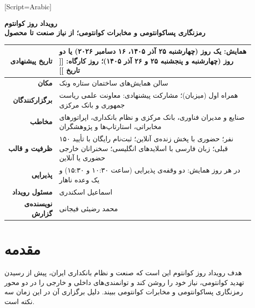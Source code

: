 \documentclass[a4paper,12pt]{article}
\newcommand{\placeholder}[1]{%
	\textcolor{mci-gold}{\textbf{[[ #1 ]]}}%
}
\begin{document}
	\fixedfont
	[Script=Arabic]

	\begin{center}
		{\color{mci-blue}\fontsize{24}{32}\selectfont\bfseries رویداد روز کوانتوم}\\[4pt]
		{\color{mci-gold}\large\bfseries رمزنگاری پساکوانتومی و مخابرات کوانتومی؛ از نیاز صنعت تا محصول}\\[2pt]
		{\color{mci-gray}\small {}}
	\end{center}

	\vspace{4pt}

	\begin{tabularx}{\textwidth}{>{\bfseries\color{mci-blue}}r X}
		\toprule
		تاریخ پیشنهادی & همایش: یک روز (چهارشنبه ۲۵ آذر ۱۴۰۵، ۱۶ دسامبر ۲۰۲۶) یا دو روز (چهارشنبه و پنجشنبه ۲۵ و ۲۶ آذر ۱۴۰۵)؛ روز کارگاه: \placeholder{تاریخ} \\
		\midrule
		مکان & سالن همایش‌های ساختمان ستاره ونک \\
		\midrule
		برگزارکنندگان & همراه اول (میزبان)؛ مشارکت پیشنهادی: معاونت علمی ریاست جمهوری و بانک مرکزی \\
		\midrule
		مخاطب & صنایع و مدیران فناوری، بانک مرکزی و نظام بانکداری، اپراتورهای مخابراتی، استارتاپ‌ها و پژوهشگران \\
		\midrule
		ظرفیت و قالب & ۱۵۰ نفر؛ حضوری با پخش زنده‌ی آنلاین؛ ثبت‌نام رایگان با تأیید قبلی؛ زبان فارسی با اسلایدهای انگلیسی؛ سخنرانان خارجی حضوری یا آنلاین \\
		\midrule
		پذیرایی & در هر روز همایش: دو وقفه‌ی پذیرایی (ساعت ۱۰:۳۰ و ۱۵:۳۰) و یک وعده ناهار \\
		\midrule
		مسئول رویداد & اسماعیل اسکندری \\
		\midrule
		نویسنده‌ی گزارش & محمد رضیئی فیجانی \\
		\bottomrule
	\end{tabularx}

	\section{مقدمه}

	هدف رویداد روز کوانتوم این است که صنعت و نظام بانکداری ایران، پیش از رسیدن تهدید کوانتومی، نیاز خود را روشن کند
	و توانمندی‌های داخلی و خارجی را در دو محور رمزنگاری پساکوانتومی و مخابرات کوانتومی ببیند.
	دلیل برگزاری آن در این زمان سه نکته است.
\end{document}
